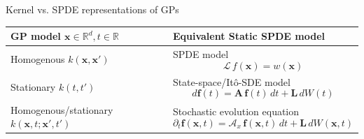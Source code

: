 \documentclass[first=dgreen,second=purple,presentation]{elecslides}
\begin{document}

\begin{frame}{Kernel vs. SPDE representations of GPs}

\begin{tabularx}{0.98\textwidth}{ | p{} | p{} | }
\hline
\cellcolor{blue!25}GP model $\mathbf{x} \in \mathbb{R}^d, t \in \mathbb{R}$ & \cellcolor{blue!25}Equivalent Static SPDE model \\
\hline
\hline
Homogenous $k(\mathbf{x},\mathbf{x}')$ &
SPDE model
\begin{equation}
  \mathcal{L} \, f(\mathbf{x}) = w(\mathbf{x})
\nonumber
\end{equation}
\\
\hline
Stationary $k(t,t')$ &
State-space/It\^o-SDE model 
\begin{equation}
d\mathbf{f}(t) = \mathbf{A} \, \mathbf{f}(t) \, dt + \mathbf{L} \, dW(t)
\nonumber
\end{equation}
\\
\hline
Homogenous/stationary $k(\mathbf{x},t;\mathbf{x}',t')$ & 
Stochastic evolution equation
\begin{equation}
\partial_t \mathbf{f}(\mathbf{x},t)
= \mathcal{A}_x \, \mathbf{f}(\mathbf{x},t) \, dt + \mathbf{L} \, dW(\mathbf{x},t)
\nonumber
\end{equation}
\\
\hline
\end{tabularx}

\end{frame}
\end{document}
